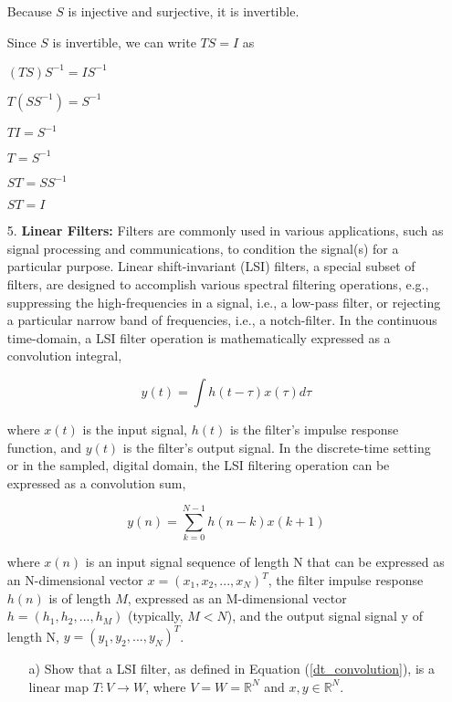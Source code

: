 \documentclass[fleqn]{article}
\begin{document}
\begin{enumerate}[nolistsep]
	Because $S$ is injective and surjective, it is invertible.
	
	Since $S$ is invertible, we can write $TS = I$ as
	
	$(TS)S^{-1} = IS^{-1}$
	
	$T(SS^{-1}) = S^{-1}$
	
	$TI = S^{-1}$
	
	$T = S^{-1}$
	
	$ST = SS^{-1}$
	
	$ST = I$
	
	\item[5.] \textbf{Linear Filters:} Filters are commonly used in various applications, such as signal processing and communications, to condition the signal(s) for a particular purpose. Linear shift-invariant (LSI) filters, a special subset of filters, are designed to accomplish various spectral filtering operations, e.g., suppressing the high-frequencies in a signal, i.e., a low-pass filter, or rejecting a particular narrow band of frequencies, i.e., a notch-filter. In the continuous time-domain, a LSI filter operation is mathematically expressed as a convolution integral,
	
		\begin{equation}
			y(t) = \int{h(t-\tau)x(\tau)d\tau}
		\end{equation}
		
		where $x(t)$ is the input signal, $h(t)$ is the filter’s impulse response function, and $y(t)$ is the filter’s output signal. In the discrete-time setting or in the sampled, digital domain, the LSI filtering operation can be expressed as a convolution sum,
	
		\begin{equation}
			y(n) = \sum_{k=0}^{N-1}{h(n-k)x(k+1)}
			\label{dt_convolution}
		\end{equation}
		
		where $x(n)$ is an input signal sequence of length N that can be expressed as an N-dimensional vector $x = (x_1, x_2, ..., x_N)^T$, the filter impulse response $h(n)$ is of length $M$, expressed as an M-dimensional vector $h = (h_1, h_2, ..., h_M)$ (typically, $M < N$), and the output signal signal y of length N, $y = (y_1, y_2, ..., y_N)^T$.
		
		\pagebreak
		\begin{enumerate}
			\item[a)] Show that a LSI filter, as defined in Equation (\ref{dt_convolution}), is a linear map $T : V \rightarrow W$, where $V = W = \mathbb{R}^N$ and $x,y \in \mathbb{R}^N$.
			

\end{enumerate}
\end{enumerate}
\end{document}
